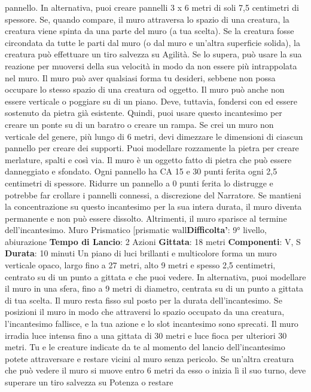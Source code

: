 \begin{multicols}{2}
pannello. In alternativa, puoi creare pannelli 3 x 6 metri
di soli 7,5 centimetri di spessore.
Se, quando compare, il muro attraversa lo spazio di una
creatura, la creatura viene spinta da una parte del muro
(a tua scelta). Se la creatura fosse circondata da tutte le
parti dal muro (o dal muro e un’altra superficie solida),
la creatura può effettuare un tiro salvezza su Agilità.
Se lo supera, può usare la sua reazione per muoversi
della sua velocità in modo da non essere più
intrappolata nel muro.
Il muro può aver qualsiasi forma tu desideri, sebbene
non possa occupare lo stesso spazio di una creatura od
oggetto. Il muro può anche non essere verticale o
poggiare su di un piano. Deve, tuttavia, fondersi con ed
essere sostenuto da pietra già esistente. Quindi, puoi
usare questo incantesimo per creare un ponte su di un
baratro o creare un rampa.
Se crei un muro non verticale del genere, più lungo di 6
metri, devi dimezzare le dimensioni di ciascun pannello
per creare dei supporti. Puoi modellare rozzamente la
pietra per creare merlature, spalti e così via.
Il muro è un oggetto fatto di pietra che può essere
danneggiato e sfondato. Ogni pannello ha CA 15 e 30
punti ferita ogni 2,5 centimetri di spessore. Ridurre un
pannello a 0 punti ferita lo distrugge e potrebbe far
crollare i pannelli connessi, a discrezione del Narratore.
Se mantieni la concentrazione su questo incantesimo
per la sua intera durata, il muro diventa permanente e
non può essere dissolto. Altrimenti, il muro sparisce al
termine dell’incantesimo.
Muro Prismatico
[prismatic wall\textbf{Difficolta'}:
9° livello, abiurazione
\textbf{Tempo di Lancio}: 2 Azioni
\textbf{Gittata}: 18 metri
\textbf{Componenti}: V, S
\textbf{Durata}: 10 minuti
Un piano di luci brillanti e multicolore forma un muro
verticale opaco, largo fino a 27 metri, alto 9 metri e
spesso 2,5 centimetri, centrato su di un punto a gittata
e che puoi vedere. In alternativa, puoi modellare il muro
in una sfera, fino a 9 metri di diametro, centrata su di un
punto a gittata di tua scelta. Il muro resta fisso sul posto
per la durata dell’incantesimo. Se posizioni il muro in
modo che attraversi lo spazio occupato da una
creatura, l’incantesimo fallisce, e la tua azione e lo slot
incantesimo sono sprecati.
Il muro irradia luce intensa fino a una gittata di 30 metri
e luce fioca per ulteriori 30 metri. Tu e le creature
indicate da te al momento del lancio dell’incantesimo
potete attraversare e restare vicini al muro senza
pericolo. Se un’altra creatura che può vedere il muro si
muove entro 6 metri da esso o inizia lì il suo turno, deve
superare un tiro salvezza su Potenza o restare

\end{multicols}
